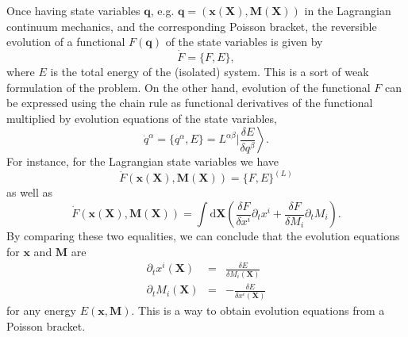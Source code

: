 \documentclass[
10pt, %
a4paper, %
oneside, %
headinclude,footinclude, %
BCOR5mm, %
]{scrartcl}
\newcommand{\xx}{\mathbf{x}}
\newcommand{\XX}{\mathbf{X}}
\newcommand{\dX}{\mathrm{d}\XX}
\newcommand{\MM}{\mathbf{M}}
\newcommand{\qq}{\mathbf{q}}
\newcommand{\MP}[1]{{\color{OliveGreen}MP:\ \ #1}}
\newcommand{\IP}[1]{{\color{Red}IP:\ \ #1}}
\newcommand{\pd}{\partial}
\newcommand{\Ffunc}{F}
\begin{document}
Once having state variables $\qq$, e.g. $\qq=(\xx(\XX),\MM(\XX))$ in the Lagrangian continuum mechanics, and the 
corresponding Poisson bracket, the reversible evolution of a functional 
$\Ffunc(\qq)$ of the state variables is given by 
\begin{equation}
	\dot{\Ffunc} = \{\Ffunc,E\},
\end{equation}
where $E$ is the total energy of the (isolated) system. This is a sort of weak formulation of the problem. On the other hand, evolution of the functional $F$ can be expressed using the chain rule as functional derivatives of the functional multiplied by evolution equations of the state variables,
\begin{equation}\label{eq.qL}
	\dot{q}^\alpha = \{q^\alpha, E\} = \left. L^{\alpha\beta}\Big| \frac{\delta E}{\delta q^\beta}\right\rangle.
\end{equation}
For instance, for the Lagrangian state variables we have 
\begin{equation}
	\dot{\Ffunc}(\xx(\XX),\MM(\XX)) = \{\Ffunc,E\}^{(L)}
\end{equation}
as well as
\begin{equation}
	\dot{\Ffunc}(\xx(\XX),\MM(\XX)) = \int\dX \left(\frac{\delta \Ffunc}{\delta 
	x^i} \partial_t x^i + \frac{\delta \Ffunc}{\delta M_i} \partial_t M_i 
	\right).
\end{equation}
By comparing these two equalities, we can conclude that the evolution equations for $\xx$ and $\MM$ are
\begin{subequations}\label{eq.L.evo}
	\begin{eqnarray}
		\partial_t x^i(\XX) &=& \frac{\delta E}{\delta M_i(\XX)}\\
		\partial_t M_i(\XX) &=& -\frac{\delta E}{\delta x^i(\XX)}\label{eq.L.evo.mom}
	\end{eqnarray}
\end{subequations}
	for any energy $E(\xx,\MM)$. 
This is a way to obtain evolution equations from a Poisson bracket.
\end{document}
